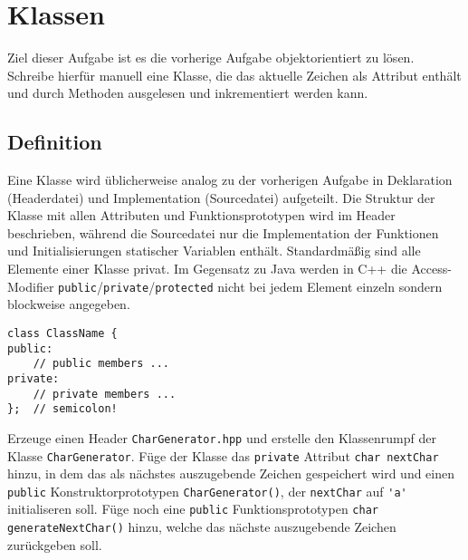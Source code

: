 \section{Klassen}
Ziel dieser Aufgabe ist es die vorherige Aufgabe objektorientiert zu lösen. Schreibe hierfür manuell eine Klasse, die das aktuelle Zeichen als Attribut enthält und durch Methoden ausgelesen und inkrementiert werden kann.


\subsection{Definition}
Eine Klasse wird üblicherweise analog zu der vorherigen Aufgabe in Deklaration (Headerdatei) und Implementation (Sourcedatei) aufgeteilt.
Die Struktur der Klasse mit allen Attributen und Funktionsprototypen wird im Header beschrieben, während die Sourcedatei nur die Implementation der Funktionen und Initialisierungen statischer Variablen enthält.
Standardmäßig sind alle Elemente einer Klasse privat.
Im Gegensatz zu Java werden in C++ die Access-Modifier \lstinline{public}/\lstinline{private}/\lstinline{protected} nicht bei jedem Element einzeln sondern blockweise angegeben.

\begin{lstlisting}
class ClassName {
public:
	// public members ...
private:
	// private members ...
};	// semicolon!
\end{lstlisting}

Erzeuge einen Header \texttt{CharGenerator.hpp} und erstelle den Klassenrumpf der Klasse \lstinline{CharGenerator}.
Füge der Klasse das \lstinline{private} Attribut \lstinline{char nextChar} hinzu, in dem das als nächstes auszugebende Zeichen gespeichert wird und einen \lstinline{public} Konstruktorprototypen \lstinline{CharGenerator()}, der \lstinline{nextChar} auf \lstinline{'a'} initialiseren soll.
Füge noch eine \lstinline{public} Funktionsprototypen \lstinline{char generateNextChar()} hinzu, welche das nächste auszugebende Zeichen zurückgeben soll.



